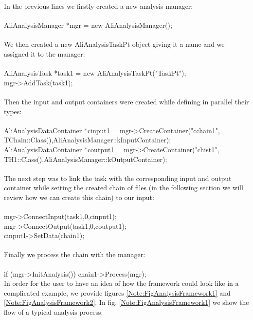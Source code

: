 \vspace{0.2 cm}
In the previous lines we firstly created a new analysis manager:\\
\\
{\ttfamily AliAnalysisManager *mgr = new AliAnalysisManager();}\\
\\
We then created a new {\ttfamily AliAnalysisTaskPt} object giving it a name and we assigned it to the manager:\\
\\
{\ttfamily AliAnalysisTask *task1 = new AliAnalysisTaskPt("TaskPt");}\\
{\ttfamily mgr->AddTask(task1);}\\
\\
Then the input and output containers were created while defining in parallel their types: \\
\\
{\ttfamily AliAnalysisDataContainer *cinput1 = mgr->CreateContainer("cchain1", TChain::Class(),AliAnalysisManager::kInputContainer);}\\
{\ttfamily AliAnalysisDataContainer *coutput1 = mgr->CreateContainer("chist1", TH1::Class(),AliAnalysisManager::kOutputContainer);}\\
\\
The next step was to link the task with the corresponding input and output container while setting the created chain of files (in the following section we will review how we can create this chain) to our input:\\
\\
{\ttfamily mgr->ConnectInput(task1,0,cinput1);}\\
{\ttfamily mgr->ConnectOutput(task1,0,coutput1);}\\
{\ttfamily cinput1->SetData(chain1);}\\
\\
Finally we process the chain with the manager:\\
\\
{\ttfamily   if (mgr->InitAnalysis()) chain1->Process(mgr);}\\

\vspace{0.5 cm}
In order for the user to have an idea of how the framework could look like in a complicated example, we provide figures \ref{Note:FigAnalysisFramework1} and \ref{Note:FigAnalysisFramework2}. In fig. \ref{Note:FigAnalysisFramework1} we show the flow of a typical analysis process:

